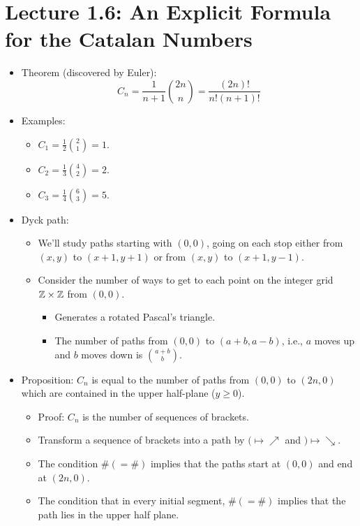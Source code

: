 \documentclass[../main.tex]{subfiles}
\begin{document}
\section{Lecture 1.6: An Explicit Formula for the Catalan Numbers}
\begin{itemize}
    \item {}Theorem (discovered by Euler):
    \begin{equation*}
        C_n = \frac{1}{n+1}\binom{2n}{n}=\frac{(2n)!}{n!(n+1)!}
    \end{equation*}
    \item Examples:
    \begin{itemize}
        \item $C_1=\frac{1}{2}\binom{2}{1}=1$.
        \item $C_2=\frac{1}{3}\binom{4}{2}=2$.
        \item $C_3=\frac{1}{4}\binom{6}{3}=5$.
    \end{itemize}
    \item Dyck path:
    \begin{itemize}
        \item We'll study paths starting with $(0,0)$, going on each stop either from $(x,y)$ to $(x+1,y+1)$ or from $(x,y)$ to $(x+1,y-1)$.
        \item Consider the number of ways to get to each point on the integer grid $\mathbb{Z}\times\mathbb{Z}$ from $(0,0)$.
        \begin{itemize}
            \item Generates a rotated Pascal's triangle.
            \item The number of paths from $(0,0)$ to $(a+b,a-b)$, i.e., $a$ moves up and $b$ moves down is $\binom{a+b}{b}$.
        \end{itemize}
    \end{itemize}
    \item Proposition: $C_n$ is equal to the number of paths from $(0,0)$ to $(2n,0)$ which are contained in the upper half-plane ($y\geq 0$).
    \begin{itemize}
        \item Proof: $C_n$ is the number of sequences of brackets.
        \item Transform a sequence of brackets into a path by $(\mapsto\nearrow$ and $)\mapsto\searrow$.
        \item The condition $\#(=\#)$ implies that the paths start at $(0,0)$ and end at $(2n,0)$.
        \item The condition that in every initial segment, $\#(=\#)$ implies that the path lies in the upper half plane.

\end{itemize}
\end{itemize}
\end{document}
